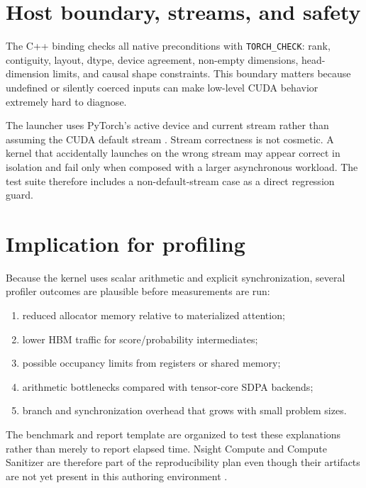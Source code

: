 \section{Host boundary, streams, and safety}

The C++ binding checks all native preconditions with \texttt{TORCH\_CHECK}: rank, contiguity, layout, dtype, device agreement, non-empty dimensions, head-dimension limits, and causal shape constraints. This boundary matters because undefined or silently coerced inputs can make low-level CUDA behavior extremely hard to diagnose.

The launcher uses PyTorch's active device and current stream rather than assuming the CUDA default stream \citep{pytorch212cuda}. Stream correctness is not cosmetic. A kernel that accidentally launches on the wrong stream may appear correct in isolation and fail only when composed with a larger asynchronous workload. The test suite therefore includes a non-default-stream case as a direct regression guard.

\section{Implication for profiling}

Because the kernel uses scalar arithmetic and explicit synchronization, several profiler outcomes are plausible before measurements are run:
\begin{enumerate}
  \item reduced allocator memory relative to materialized attention;
  \item lower HBM traffic for score/probability intermediates;
  \item possible occupancy limits from registers or shared memory;
  \item arithmetic bottlenecks compared with tensor-core SDPA backends;
  \item branch and synchronization overhead that grows with small problem sizes.
\end{enumerate}

The benchmark and report template are organized to test these explanations rather than merely to report elapsed time. Nsight Compute and Compute Sanitizer are therefore part of the reproducibility plan even though their artifacts are not yet present in this authoring environment \citep{nvidia2026nsight,nvidia2026sanitizer}.
